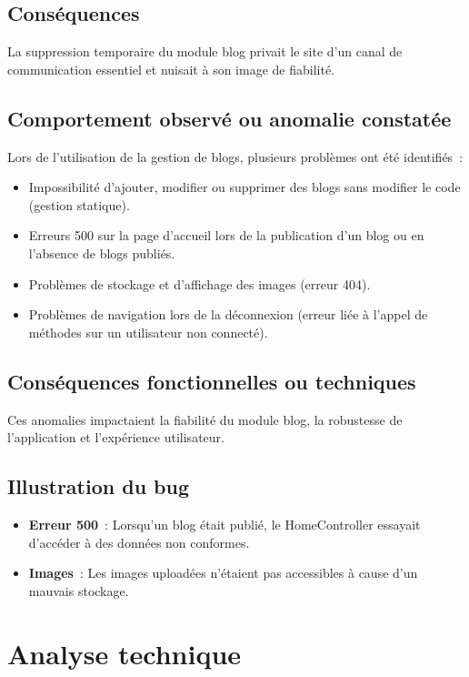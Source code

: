 \documentclass[a4paper,12pt]{report}
\begin{document}
\subsection{Conséquences}
La suppression temporaire du module blog privait le site d’un canal de communication essentiel et nuisait à son image de fiabilité.

\subsection{Comportement observé ou anomalie constatée}
Lors de l’utilisation de la gestion de blogs, plusieurs problèmes ont été identifiés :
\begin{itemize}
    \item Impossibilité d’ajouter, modifier ou supprimer des blogs sans modifier le code (gestion statique).
    \item Erreurs 500 sur la page d’accueil lors de la publication d’un blog ou en l’absence de blogs publiés.
    \item Problèmes de stockage et d’affichage des images (erreur 404).
    \item Problèmes de navigation lors de la déconnexion (erreur liée à l’appel de méthodes sur un utilisateur non connecté).
\end{itemize}

\subsection{Conséquences fonctionnelles ou techniques}
Ces anomalies impactaient la fiabilité du module blog, la robustesse de l’application et l’expérience utilisateur.

\subsection{Illustration du bug}
\begin{itemize}
    \item \textbf{Erreur 500} : Lorsqu’un blog était publié, le HomeController essayait d’accéder à des données non conformes.
    \item \textbf{Images} : Les images uploadées n’étaient pas accessibles à cause d’un mauvais stockage.
\end{itemize}

\section{Analyse technique}
\end{document}
